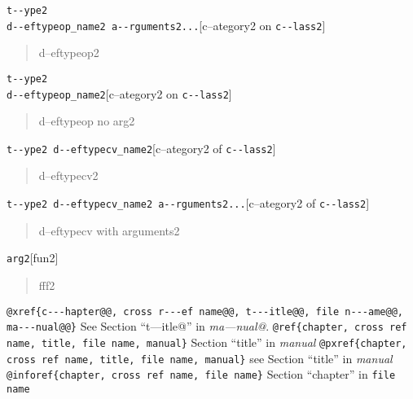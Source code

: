 \documentclass{book}
\begin{document}
\begin{titlepage}
\noindent\texttt{t{-}{-}ype2\leavevmode{}\\d{-}{-}eftypeop\_name2 a{-}{-}rguments2...}\hfill[c--ategory2 on \texttt{c{-}{-}lass2}]



%
\begin{quote}
d--eftypeop2
\end{quote}

\noindent\texttt{t{-}{-}ype2\leavevmode{}\\d{-}{-}eftypeop\_name2}\hfill[c--ategory2 on \texttt{c{-}{-}lass2}]



%
\begin{quote}
d--eftypeop no arg2
\end{quote}

\noindent\texttt{t{-}{-}ype2 d{-}{-}eftypecv\_name2}\hfill[c--ategory2 of \texttt{c{-}{-}lass2}]



%
\begin{quote}
d--eftypecv2
\end{quote}

\noindent\texttt{t{-}{-}ype2 d{-}{-}eftypecv\_name2 a{-}{-}rguments2...}\hfill[c--ategory2 of \texttt{c{-}{-}lass2}]



%
\begin{quote}
d--eftypecv with arguments2
\end{quote}

\noindent\texttt{arg2}\hfill[fun2]



%
\begin{quote}
fff2
\end{quote}


\texttt{@xref\{c{-}{-}{-}hapter@@, cross r{-}{-}{-}ef name@@, t{-}{-}{-}itle@@, file n{-}{-}{-}ame@@, ma{-}{-}{-}nual@@\}} See Section ``t---itle@'' in \textsl{ma---nual@}.
\texttt{@ref\{chapter, cross ref name, title, file name, manual\}} Section ``title'' in \textsl{manual}
\texttt{@pxref\{chapter, cross ref name, title, file name, manual\}} see Section ``title'' in \textsl{manual}
\texttt{@inforef\{chapter, cross ref name, file name\}} Section ``chapter'' in \texttt{file name}


\end{titlepage}
\end{document}
